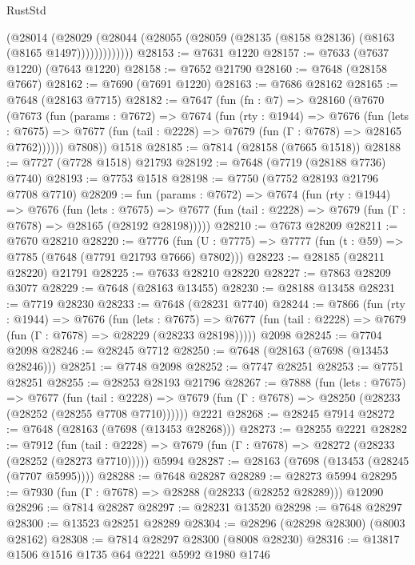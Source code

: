 \begin{lexlean}{RustStd}
\begin{coremodule}
{\begin{coremodule}
{{{{{{{{{{{{{{{{{{{{{{{{{{{{{{{{{{{{{{{{{{{{{{{{{{{{{              (@28014
                (@28029
                  (@28044 (@28055 (@28059 (@28135 (@8158 @28136) (@8163 (@8165 @1497)))))))))))))
@28153 := @7631 @1220
@28157 := @7633 (@7637 @1220) (@7643 @1220)
@28158 := @7652 @21790
@28160 := @7648 (@28158 @7667)
@28162 := @7690 (@7691 @1220)
@28163 := @7686 @28162
@28165 := @7648 (@28163 @7715)
@28182 := @7647
    (fun (fn : @7) =>
    @28160
      (@7670
        (@7673
          (fun (params : @7672) =>
          @7674
            (fun (rty : @1944) =>
            @7676
              (fun (lets : @7675) =>
              @7677 (fun (tail : @2228) => @7679 (fun (Γ : @7678) => @28165 @7762))))))
        @7808))
    @1518
@28185 := @7814 (@28158 (@7665 @1518))
@28188 := @7727 (@7728 @1518) @21793
@28192 := @7648 (@7719 (@28188 @7736) @7740)
@28193 := @7753 @1518
@28198 := @7750 (@7752 @28193 @21796 @7708 @7710)
@28209 := fun (params : @7672) =>
  @7674
    (fun (rty : @1944) =>
    @7676
      (fun (lets : @7675) =>
      @7677 (fun (tail : @2228) => @7679 (fun (Γ : @7678) => @28165 (@28192 @28198)))))
@28210 := @7673 @28209
@28211 := @7670 @28210
@28220 := @7776
    (fun (U : @7775) => @7777 (fun (t : @59) => @7785 (@7648 (@7791 @21793 @7666) @7802)))
@28223 := @28185 (@28211 @28220) @21791
@28225 := @7633 @28210 @28220
@28227 := @7863 @28209 @3077
@28229 := @7648 (@28163 @13455)
@28230 := @28188 @13458
@28231 := @7719 @28230
@28233 := @7648 (@28231 @7740)
@28244 := @7866
    (fun (rty : @1944) =>
    @7676
      (fun (lets : @7675) =>
      @7677 (fun (tail : @2228) => @7679 (fun (Γ : @7678) => @28229 (@28233 @28198)))))
    @2098
@28245 := @7704 @2098
@28246 := @28245 @7712
@28250 := @7648 (@28163 (@7698 (@13453 @28246)))
@28251 := @7748 @2098
@28252 := @7747 @28251
@28253 := @7751 @28251
@28255 := @28253 @28193 @21796
@28267 := @7888
    (fun (lets : @7675) =>
    @7677
      (fun (tail : @2228) =>
      @7679 (fun (Γ : @7678) => @28250 (@28233 (@28252 (@28255 @7708 @7710))))))
    @2221
@28268 := @28245 @7914
@28272 := @7648 (@28163 (@7698 (@13453 @28268)))
@28273 := @28255 @2221
@28282 := @7912
    (fun (tail : @2228) => @7679 (fun (Γ : @7678) => @28272 (@28233 (@28252 (@28273 @7710)))))
    @5994
@28287 := @28163 (@7698 (@13453 (@28245 (@7707 @5995))))
@28288 := @7648 @28287
@28289 := @28273 @5994
@28295 := @7930 (fun (Γ : @7678) => @28288 (@28233 (@28252 @28289))) @12090
@28296 := @7814 @28287
@28297 := @28231 @13520
@28298 := @7648 @28297
@28300 := @13523 @28251 @28289
@28304 := @28296 (@28298 @28300) (@8003 @28162)
@28308 := @7814 @28297 @28300 (@8008 @28230)
@28316 := @13817 @1506 @1516 @1735 @64 @2221 @5992 @1980 @1746
}}}}}}}}}}}}}}}}}}}}}}}}}}}}}}}}}}}}}}}}}}}}}}}}}}}}}
\end{coremodule}}
\end{coremodule}
\end{lexlean}

